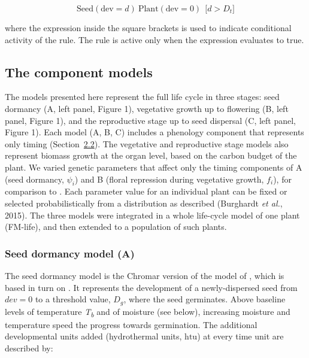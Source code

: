 \documentclass[phd]{infthesis}
\begin{document}
\[\text{Seed}\left( \text{dev} = d \right)\ \text{Plant}\left( \text{dev} = 0 \right)\ \ \lbrack d > D_{t}\rbrack\]

where the expression inside the square brackets is used to indicate
conditional activity of the rule. The rule is active only when the
expression evaluates to true.

\subsection{The component models}
\label{the-component-models}

The models presented here represent the full life cycle in three stages:
seed dormancy (A, left panel, Figure 1), vegetative growth up to
flowering (B, left panel, Figure 1), and the reproductive stage up to
seed dispersal (C, left panel, Figure 1). Each model (A, B, C) includes
a phenology component that represents only timing
(Section~\protect\hyperlink{phenology-models-in-chromar}{2.2}). The
vegetative and reproductive stage models also represent biomass growth
at the organ level, based on the carbon budget of the plant. We varied
genetic parameters that affect only the timing components of A (seed
dormancy, \(\psi_{i}\)) and B (floral repression during vegetative
growth, \(f_{i}\)), for comparison to \citet{burghardt_modeling_2015}.
Each parameter value for an individual plant can be fixed or selected
probabilistically from a distribution as described (Burghardt \emph{et
al.}, 2015). The three models were integrated in a whole life-cycle
model of one plant (FM-life), and then extended to a population of such
plants.

\subsubsection{Seed dormancy model (A)}
\label{seed-dormancy-model-a}

The seed dormancy model is the Chromar version of the model of
\citet{burghardt_modeling_2015}, which is based in turn on
\citet{alvarado_hydrothermal_2002}. It represents the development of a
newly-dispersed seed from \(dev = 0\) to a threshold value, \(D_{g}\), where the
seed germinates. Above baseline levels of temperature \emph{T\textsubscript{b}}
and of moisture (see below), increasing moisture and temperature speed the
progress towards germination. The additional developmental units added
(hydrothermal units, \(\text{htu}\)) at every time unit are described by:
\end{document}
